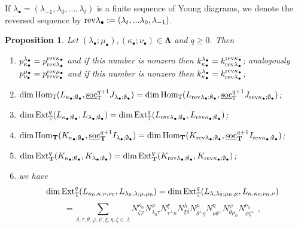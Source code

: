 \documentclass[12pt]{article}
\def\TT {{\mathbb T}}     %
\def\ul  {\underline}
\newtheorem{prop}[theorem]{Proposition}
\begin{document}

If $\lambda_\bullet=(\lambda_{-1},\lambda_0,...,\lambda_t)$ is a finite sequence of Young diagrams, we denote the reversed sequence by ${\rm rev}\lambda_\bullet:=(\lambda_t,...\lambda_0,\lambda_{-1})$.


\begin{prop}\label{Prop REV SYM}
Let $(\lambda_\bullet;\mu_\bullet),(\kappa_\bullet;\nu_\bullet)\in\bm\Lambda$ and $q\geq 0$. Then
\begin{enumerate}
\item $p^{\lambda_\bullet}_{\kappa_\bullet} = p_{{\rm rev}\lambda_\bullet}^{{\rm rev}\kappa_\bullet}$ and if this number is nonzero then $k^{\lambda_\bullet}_{\kappa_\bullet} = k_{{\rm rev}\lambda_\bullet}^{{\rm rev}\kappa_\bullet}$; analogously $p^{\mu_\bullet}_{\nu_\bullet} = p_{{\rm rev}\nu_\bullet}^{{\rm rev}\mu_\bullet}$ and if this number is nonzero then $k^{\lambda_\bullet}_{\kappa_\bullet} = k_{{\rm rev}\lambda_\bullet}^{{\rm rev}\kappa_\bullet}$;
\item $\dim{\rm Hom}_\TT(L_{\kappa_\bullet;\emptyset_\bullet},\ul{\rm soc}_\TT^{q+1}J_{\lambda_\bullet;\emptyset_\bullet}) = \dim{\rm Hom}_\TT(L_{{\rm rev}\lambda_\bullet;\emptyset_\bullet},\ul{\rm soc}_\TT^{q+1}J_{{\rm rev}\kappa_\bullet;\emptyset_\bullet})$;
\item $\dim{\rm Ext}_\TT^q(L_{\kappa_\bullet;\emptyset_\bullet},L_{\lambda_\bullet;\emptyset_\bullet}) = \dim{\rm Ext}_\TT^q(L_{{\rm rev}\lambda_\bullet;\emptyset_\bullet},L_{{\rm rev}\kappa_\bullet;\emptyset_\bullet})$;
\item $\dim{\rm Hom}_{\bf T}(K_{\kappa_\bullet;\emptyset_\bullet},\ul{\rm soc}_{\bf T}^{q+1}I_{\lambda_\bullet;\emptyset_\bullet}) = \dim{\rm Hom}_{\bf T}(K_{{\rm rev}\lambda_\bullet;\emptyset_\bullet},\ul{\rm soc}_{\bf T}^{q+1}I_{{\rm rev}\kappa_\bullet;\emptyset_\bullet})$;
\item $\dim{\rm Ext}_{\bf T}^q(K_{\kappa_\bullet;\emptyset_\bullet},K_{\lambda_\bullet;\emptyset_\bullet}) = \dim{\rm Ext}_{\bf T}^q(K_{{\rm rev}\lambda_\bullet;\emptyset_\bullet},K_{{\rm rev}\kappa_\bullet;\emptyset_\bullet})$;
\item we have
$$
\dim{\rm Ext}^q_\TT(L_{\kappa_0,\kappa;\nu,\nu_0},L_{\lambda_0,\lambda;\mu,\mu_0}) = \dim{\rm Ext}^q_\TT(L_{\lambda,\lambda_0;\mu_0,\mu},L_{\kappa,\kappa_0;\nu_0,\nu})
$$
$$
= \sum\limits_{\delta,\tau,\theta,\varphi,\psi,\xi,\eta,\zeta\in\Lambda} N^{\kappa_0}_{\zeta\varphi} N^{\varphi}_{\lambda_0\tau} N^{\xi}_{\tau^\perp\kappa} N^{\lambda}_{\xi\delta} N^{\mu}_{\delta^\perp\eta} N^{\eta}_{\nu\theta^\perp} N^{\psi}_{\theta\mu_0} N^{\nu_0}_{\psi\zeta^\perp} \;,
$$
\end{enumerate}
\end{prop}
\end{document}
